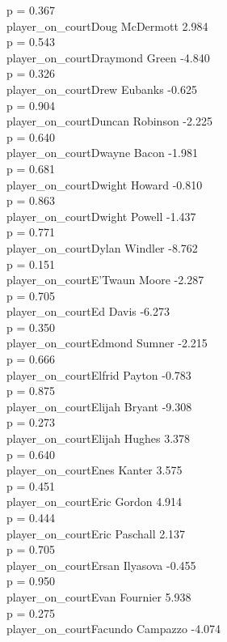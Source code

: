 \documentclass[
  landscape]{article}
\begin{document}
p = 0.367\\
player\_on\_courtDoug McDermott 2.984\\
p = 0.543\\
player\_on\_courtDraymond Green -4.840\\
p = 0.326\\
player\_on\_courtDrew Eubanks -0.625\\
p = 0.904\\
player\_on\_courtDuncan Robinson -2.225\\
p = 0.640\\
player\_on\_courtDwayne Bacon -1.981\\
p = 0.681\\
player\_on\_courtDwight Howard -0.810\\
p = 0.863\\
player\_on\_courtDwight Powell -1.437\\
p = 0.771\\
player\_on\_courtDylan Windler -8.762\\
p = 0.151\\
player\_on\_courtE'Twaun Moore -2.287\\
p = 0.705\\
player\_on\_courtEd Davis -6.273\\
p = 0.350\\
player\_on\_courtEdmond Sumner -2.215\\
p = 0.666\\
player\_on\_courtElfrid Payton -0.783\\
p = 0.875\\
player\_on\_courtElijah Bryant -9.308\\
p = 0.273\\
player\_on\_courtElijah Hughes 3.378\\
p = 0.640\\
player\_on\_courtEnes Kanter 3.575\\
p = 0.451\\
player\_on\_courtEric Gordon 4.914\\
p = 0.444\\
player\_on\_courtEric Paschall 2.137\\
p = 0.705\\
player\_on\_courtErsan Ilyasova -0.455\\
p = 0.950\\
player\_on\_courtEvan Fournier 5.938\\
p = 0.275\\
player\_on\_courtFacundo Campazzo -4.074\\
\end{document}
